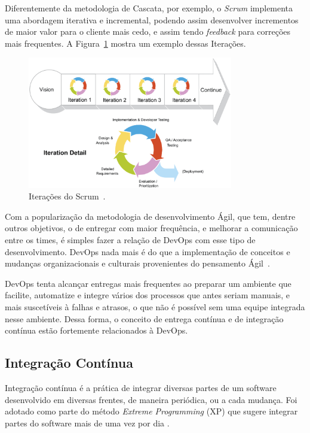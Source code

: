 Diferentemente da metodologia de Cascata, por exemplo, o \textit{Scrum} implementa uma
abordagem iterativa e incremental, podendo assim desenvolver incrementos de
maior valor para o cliente mais cedo, e assim tendo \textit{feedback} para correções
mais frequentes. A Figura~\ref{fig:iterativ} mostra um exemplo dessas
Iterações.~\cite{scrumreference:2016}

\begin{figure}[H]
  \centering
  \caption{Iterações do Scrum~\cite{scrumreference:2016}.}
  \label{fig:iterativ}
  \includegraphics[width=0.8\textwidth]{figuras/iterative.eps}
\end{figure}

Com a popularização da metodologia de desenvolvimento Ágil, que tem, dentre outros
objetivos, o de entregar com maior frequência, e melhorar a comunicação entre os
times, é simples fazer a relação de DevOps com esse tipo de desenvolvimento.
DevOps nada mais é do que a implementação de conceitos e mudanças organizacionais
e culturais provenientes do pensamento Ágil~\cite{scott2014}.

DevOps tenta alcançar entregas mais frequentes ao preparar um ambiente que facilite,
automatize e integre vários dos processos que antes seriam manuais, e mais
suscetíveis à falhas e atrasos, o que não é possível sem uma equipe integrada
nesse ambiente. Dessa forma, o conceito de entrega contínua e de integração
contínua estão fortemente relacionados à DevOps.~\cite{adambertram:2016}

\subsection{Integração Contínua}

Integração contínua é a prática de integrar diversas partes de um software
desenvolvido em diversas frentes, de maneira periódica, ou a cada mudança.
Foi adotado como parte do método \textit{Extreme Programming} (XP) que sugere integrar
partes do software mais de uma vez por dia \cite{fowler2006continuous}.

